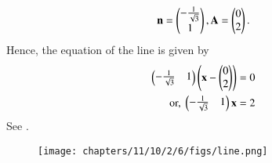 \begin{align}
    \mathbf{n} =  \begin{pmatrix}-\frac{1}{\sqrt{3}} \\ 1\end{pmatrix},
    \mathbf{A} = \begin{pmatrix}0 \\ 2\end{pmatrix}.
\end{align}
Hence, 
the equation of the line is given by
\begin{align}
\begin{pmatrix}-\frac{1}{\sqrt{3}}&1\end{pmatrix}\left( \mathbf{x} - \begin{pmatrix}0 \\ 2\end{pmatrix}\right) &= 0  \\
    \text{or, }	\begin{pmatrix}-\frac{1}{\sqrt{3}}&1\end{pmatrix} \mathbf{x}  &= 2
\end{align}
%
See
    .
\begin{figure}[H]
    \centering
    \texttt{[image: chapters/11/10/2/6/figs/line.png]}
    \caption{}
    \label{fig:chapters/11/10/2/6/line}
\end{figure}

